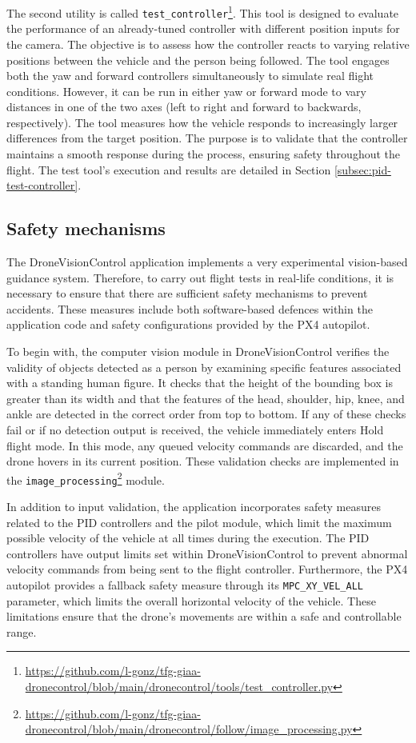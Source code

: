 The second utility is called \texttt{test\_controller}\footnote{\url{https://github.com/l-gonz/tfg-giaa-dronecontrol/blob/main/dronecontrol/tools/test_controller.py}}. This tool is designed to evaluate the performance of an already-tuned controller with different position inputs for the camera. The objective is to assess how the controller reacts to varying relative positions between the vehicle and the person being followed. The tool engages both the yaw and forward controllers simultaneously to simulate real flight conditions. However, it can be run in either yaw or forward mode to vary distances in one of the two axes (left to right and forward to backwards, respectively). The tool measures how the vehicle responds to increasingly larger differences from the target position. The purpose is to validate that the controller maintains a smooth response during the process, ensuring safety throughout the flight. The test tool's execution and results are detailed in Section \ref{subsec:pid-test-controller}.

\subsection{Safety mechanisms}
\label{subsec:safety}

The DroneVisionControl application implements a very experimental vision-based guidance system.
Therefore, to carry out flight tests in real-life conditions, it is necessary to ensure that there are sufficient safety mechanisms to prevent accidents.
These measures include both software-based defences within the application code and safety configurations provided by the PX4 autopilot.

To begin with, the computer vision module in DroneVisionControl verifies the validity of objects detected as a person by examining specific features associated with a standing human figure. It checks that the height of the bounding box is greater than its width and that the features of the head, shoulder, hip, knee, and ankle are detected in the correct order from top to bottom. If any of these checks fail or if no detection output is received, the vehicle immediately enters Hold flight mode. In this mode, any queued velocity commands are discarded, and the drone hovers in its current position. These validation checks are implemented in the \texttt{image\_processing}\footnote{\url{https://github.com/l-gonz/tfg-giaa-dronecontrol/blob/main/dronecontrol/follow/image_processing.py}} module.

In addition to input validation, the application incorporates safety measures related to the PID controllers and the pilot module, which limit the maximum possible velocity of the vehicle at all times during the execution. The PID controllers have output limits set within DroneVisionControl to prevent abnormal velocity commands from being sent to the flight controller. Furthermore, the PX4 autopilot provides a fallback safety measure through its \texttt{MPC\_XY\_VEL\_ALL} parameter, which limits the overall horizontal velocity of the vehicle. These limitations ensure that the drone's movements are within a safe and controllable range.

